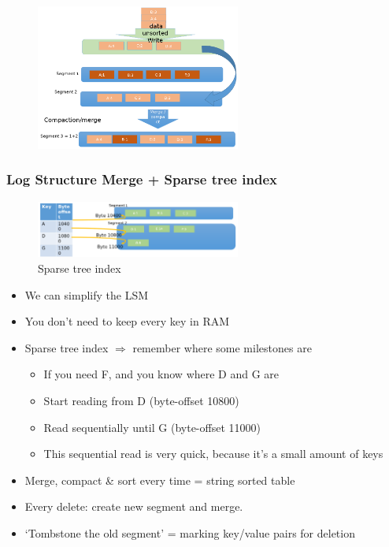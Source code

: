 \documentclass{article}
\begin{document}
\begin{figure}[H]
    \centering
    \includegraphics[width=0.6\textwidth]{lsm.png}
\end{figure}


\subsubsection{Log Structure Merge + Sparse tree index}

\begin{figure}[H]
    \centering
    \includegraphics[width=0.6\textwidth]{lsm-sparse-tree-index.png}
    \caption{Sparse tree index}
\end{figure}


\begin{itemize}
    \item We can simplify the LSM
    \item You don't need to keep every key in RAM
    \item Sparse tree index $\Rightarrow$ remember where some milestones are
    \begin{itemize}
        \item If you need F, and you know where D and G are
        \item Start reading from D (byte-offset 10800)
        \item Read sequentially until G (byte-offset 11000)
        \item This sequential read is very quick, because it's a small amount of keys
    \end{itemize}
    \item Merge, compact \& sort every time = string sorted table
    \item Every delete: create new segment and merge. 
    \item `Tombstone the old segment' = marking key/value pairs for deletion
\end{itemize}
\end{document}
